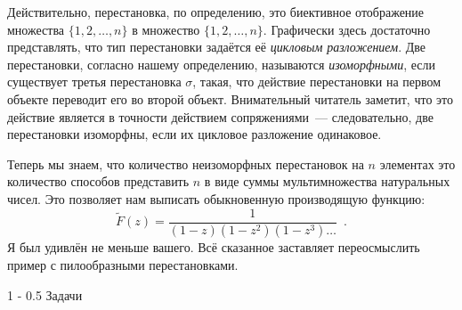\documentclass[a5paper]{article}
\makeatletter
\theoremstyle{definition}
\renewcommand{\section}{\@startsection
{section}%
{1}%
{\z@}%
{-\baselineskip}%
{0.5\baselineskip}%
{\centering\large\scshape}} %
\makeatother
\begin{document}
Действительно, перестановка, по определению, это биективное отображение 
множества \( \{ 1, 2, \ldots, n \} \) в множество \( \{ 1, 2, \ldots, n \} \). 
Графически здесь достаточно представлять, что тип перестановки задаётся её 
\textit{цикловым разложением}. Две перестановки, согласно нашему определению, 
называются \textit{изоморфными}, если существует третья перестановка \( \sigma 
\), такая, что действие перестановки на первом объекте переводит его во второй 
объект. Внимательный читатель заметит, что это действие является в точности 
действием сопряжениями~--- следовательно, две перестановки изоморфны, если их 
цикловое разложение одинаковое.

Теперь мы знаем, что количество неизоморфных перестановок на \( n \) элементах 
это количество способов представить \( n \) в виде суммы мультимножества 
натуральных чисел. Это позволяет нам выписать обыкновенную производящую функцию:
\[
	\widetilde{F}(z) = \dfrac{1}{(1-z)(1-z^2)(1-z^3) \ldots} \enspace .
\]
Я был удивлён не меньше вашего. Всё сказанное заставляет переосмыслить пример с 
пилообразными перестановками.

\section{Задачи}
\end{document}
